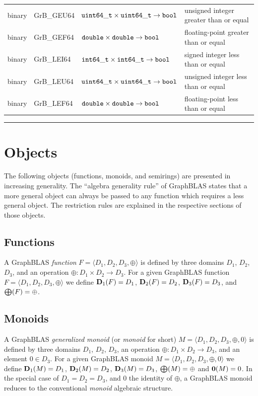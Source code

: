 \documentclass[11pt]{extarticle}
\begin{document}
\begin{table}
\begin{center}
\begin{tabular}{l|l|l|l}
binary		& {\sf GrB\_GEU64}	& ${\tt uint64\_t} \times {\tt uint64\_t} \rightarrow {\tt bool}$ 	& unsigned integer greater than or equal \\
binary		& {\sf GrB\_GEF64}	& ${\tt double} \times {\tt double} \rightarrow {\tt bool}$ 		& floating-point greater than or equal \\
binary		& {\sf GrB\_LEI64}	& ${\tt int64\_t} \times {\tt int64\_t} \rightarrow {\tt bool}$		& signed integer less than or equal \\
binary		& {\sf GrB\_LEU64}	& ${\tt uint64\_t} \times {\tt uint64\_t} \rightarrow {\tt bool}$ 	& unsigned integer less than or equal \\
binary		& {\sf GrB\_LEF64}	& ${\tt double} \times {\tt double} \rightarrow {\tt bool}$ 		& floating-point less than or equal \\
\end{tabular}
\end{center}
\hrule
\end{table}

\section{Objects}

The following objects (functions, monoids, and semirings) are presented in increasing generality.
The ``algebra generality rule'' of GraphBLAS states that a more general object can always be passed to
any function which requires a less general object. The restriction rules are explained in the respective sections of those objects.

\subsection{Functions}

A GraphBLAS \emph{function} $F = \langle D_1,D_2,D_3,\oplus \rangle$
is defined by three domains $D_1$, $D_2$, $D_3$, and an operation
$\oplus: D_1 \times D_2 \rightarrow D_3$.  For a given GraphBLAS function
$F=\langle D_1, D_2, D_3,\oplus \rangle$ we define $\bold{D}_1(F) = D_1$,
$\bold{D}_2(F) = D_2$, $\bold{D}_3(F) = D_3$, and $\bold{\bigoplus}(F)
= \oplus$.



\subsection{Monoids}

A GraphBLAS \emph{generalized monoid} (or \emph{monoid} for short) $M =
\langle D_1,D_2,D_3,\oplus,0 \rangle$ is defined by three domains $D_1$,
$D_2$, $D_3$, an operation $\oplus: D_1 \times D_2 \rightarrow D_3$,
and an element $0 \in D_3$.  For a given GraphBLAS monoid $M=\langle
D_1, D_2, D_3,\oplus,0 \rangle$ we define $\bold{D}_1(M) = D_1$,
$\bold{D}_2(M) = D_2$, $\bold{D}_3(M) = D_3$, $\bold{\bigoplus}(M) =
\oplus$ and $\bold{0}(M) = 0$.  In the  special case of $D_1 = D_2 =
D_3$, and $0$ the identity of $\oplus$, a GraphBLAS monoid reduces to
the conventional \emph{monoid} algebraic structure.
\end{document}
